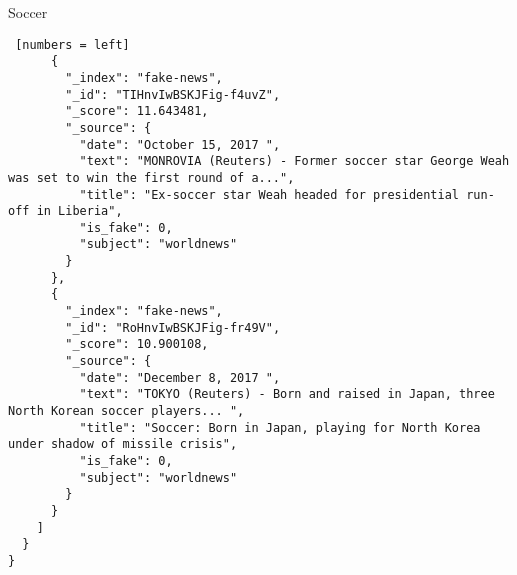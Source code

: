 \newpage

\begin{algorithm}[h!]
\caption{Soccer}
\begin{lstlisting} [numbers = left]
      {
        "_index": "fake-news",
        "_id": "TIHnvIwBSKJFig-f4uvZ",
        "_score": 11.643481,
        "_source": {
          "date": "October 15, 2017 ",
          "text": "MONROVIA (Reuters) - Former soccer star George Weah was set to win the first round of a...",
          "title": "Ex-soccer star Weah headed for presidential run-off in Liberia",
          "is_fake": 0,
          "subject": "worldnews"
        }
      },
      {
        "_index": "fake-news",
        "_id": "RoHnvIwBSKJFig-fr49V",
        "_score": 10.900108,
        "_source": {
          "date": "December 8, 2017 ",
          "text": "TOKYO (Reuters) - Born and raised in Japan, three North Korean soccer players... ",
          "title": "Soccer: Born in Japan, playing for North Korea under shadow of missile crisis",
          "is_fake": 0,
          "subject": "worldnews"
        }
      }
    ]
  }
}
\end{lstlisting}
\end{algorithm}